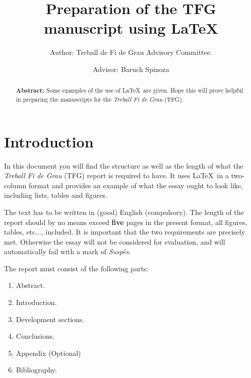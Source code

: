 \documentclass[twocolumn]{revtex4}
\begin{document}


\pagestyle{fancy}


\title{Preparation of the TFG manuscript 
using \LaTeX}
\author{Author: Treball de Fi de Grau Advisory Committee.}
\author{Advisor: Baruch Spinoza}

\begin{abstract}
{\bf Abstract:} Some examples of the use of \LaTeX\ are given. Hope 
this will prove
helpful in preparing the manuscripts for the {\it Treball Fi de Grau} 
(TFG).
\end{abstract}

\maketitle


\section{Introduction}
In this document you will find the structure as well as the length
of what the {\it Treball Fi de Grau} (TFG) report is
required to have. It uses
\LaTeX\ in a two-column format and provides an example of what the essay 
ought to look like, including lists, tables and figures.

The text has to be written in (good) English (compulsory).
The length of the report should by no means exceed {\bf five} pages in the 
present format,
all figures, tables, etc..., included. It is important that the
two requirements are precisely met. Otherwise the essay will not be
considered for evaluation, and will automatically fail with
a mark of {\it Susp\`es}.

The report must consist of the following parts:
\begin{enumerate}
\item Abstract.
\item Introduction.
\item Development sections.
\item Conclusions.
\item Appendix (Optional)
\item Bibliography.
\end{enumerate}
\end{document}
